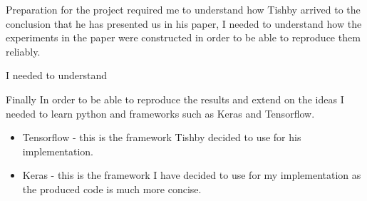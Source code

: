 Preparation for the project required me to understand how Tishby arrived to the
conclusion that he has presented us in his paper, I needed to understand how the
experiments in the paper were constructed in order to be able to reproduce them reliably.

I needed to understand 

Finally In order to be able to reproduce the results and extend on the ideas I
needed to learn python and frameworks such as Keras and Tensorflow.
\begin{itemize}
  \item{
      Tensorflow - this is the framework Tishby decided to use for
      his implementation.
    }
  \item{
      Keras - this is the framework I have decided to use for my implementation
      as the produced code is much more concise.
    }
\end{itemize}


